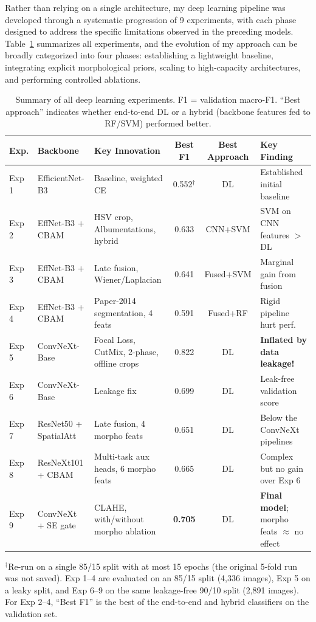 \documentclass[twocolumn,a4paper]{article}
\begin{document}
Rather than relying on a single architecture, my deep learning pipeline was developed through a systematic progression of 9 experiments, with each phase designed to address the specific limitations observed in the preceding models. Table~\ref{tab:iterations} summarizes all experiments, and the evolution of my approach can be broadly categorized into four phases: establishing a lightweight baseline, integrating explicit morphological priors, scaling to high-capacity architectures, and performing controlled ablations.

\begin{table}[t]
\centering
\caption{Summary of all deep learning experiments. F1 = validation macro-F1. ``Best approach'' indicates whether end-to-end DL or a hybrid (backbone features fed to RF/SVM) performed better.}
\label{tab:iterations}
\footnotesize
\setlength{\tabcolsep}{4pt}
\begin{tabular}{@{}ll>{\raggedright\arraybackslash}p{4.6cm}cc>{\raggedright\arraybackslash}p{4.4cm}@{}}
\toprule
\textbf{Exp.} & \textbf{Backbone} & \textbf{Key Innovation} & \textbf{Best F1} & \textbf{Best Approach} & \textbf{Key Finding} \\
\midrule
Exp 1 & EfficientNet-B3 & Baseline, weighted CE & 0.552$^\dagger$ & DL & Established initial baseline \\
Exp 2 & EffNet-B3 + CBAM & HSV crop, Albumentations, hybrid & 0.633 & CNN+SVM & SVM on CNN features $>$ DL \\
Exp 3 & EffNet-B3 + CBAM & Late fusion, Wiener/Laplacian & 0.641 & Fused+SVM & Marginal gain from fusion \\
Exp 4 & EffNet-B3 + CBAM & Paper-2014 segmentation, 4 feats & 0.591 & Fused+RF & Rigid pipeline hurt perf.\ \\
Exp 5 & ConvNeXt-Base & Focal Loss, CutMix, 2-phase, offline crops & 0.822 & DL & \textbf{Inflated by data leakage!} \\
Exp 6 & ConvNeXt-Base & Leakage fix & 0.699 & DL & Leak-free validation score \\
Exp 7 & ResNet50 + SpatialAtt & Late fusion, 4 morpho feats & 0.651 & DL & Below the ConvNeXt pipelines \\
Exp 8 & ResNeXt101 + CBAM & Multi-task aux heads, 6 morpho feats & 0.665 & DL & Complex but no gain over Exp 6 \\
Exp 9 & ConvNeXt + SE gate & CLAHE, with/without morpho ablation & \textbf{0.705} & DL & \textbf{Final model}; morpho feats $\approx$ no effect \\
\bottomrule
\end{tabular}

\vspace{2pt}
{\footnotesize $^\dagger$Re-run on a single 85/15 split with at most 15 epochs (the original 5-fold run was not saved). Exp 1--4 are evaluated on an 85/15 split (4,336 images), Exp 5 on a leaky split, and Exp 6--9 on the same leakage-free 90/10 split (2,891 images). For Exp 2--4, ``Best F1'' is the best of the end-to-end and hybrid classifiers on the validation set.}
\end{table}
\end{document}
